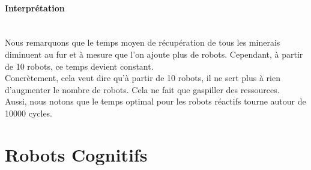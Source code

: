 \begin{center}
\end{center}

\paragraph*{Interprétation}
~\\
Nous remarquons que le temps moyen de récupération de tous les minerais diminuent au fur et à mesure que l'on ajoute plus de robots. Cependant, à partir de 10 robots, ce temps devient constant.\\
Concrètement, cela veut dire qu'à partir de 10 robots, il ne sert plus à rien d'augmenter le nombre de robots. Cela ne fait que gaspiller des ressources. \\ Aussi, nous notons que le temps optimal pour les robots réactifs tourne autour de 10000 cycles.

\hskip7mm


\section{Robots Cognitifs}

